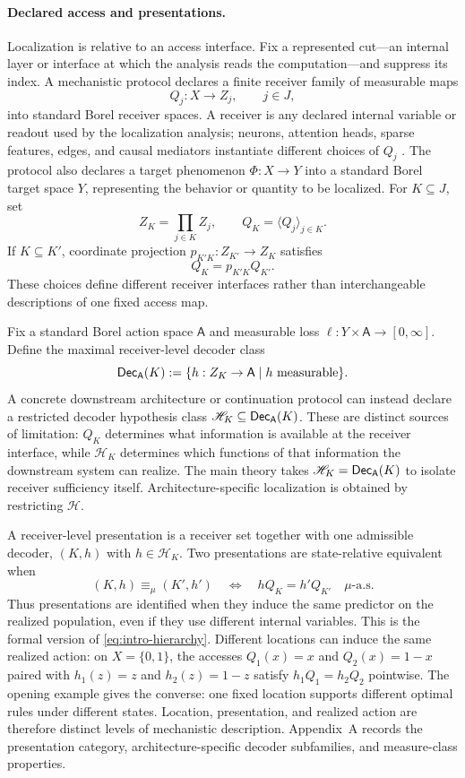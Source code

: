 \paragraph{Declared access and presentations.}
Localization is relative to an access interface. Fix a represented cut---an internal layer or interface at which the analysis reads the computation---and suppress its index. A mechanistic protocol declares a finite receiver family of measurable maps
\[
Q_j:X\to Z_j,\qquad j\in J,
\]
into standard Borel receiver spaces. A receiver is any declared internal variable or readout used by the localization analysis; neurons, attention heads, sparse features, edges, and causal mediators instantiate different choices of $Q_j$ \citep{mueller2025mib,mueller2026mediator}. The protocol also declares a target phenomenon $\Phi:X\to Y$ into a standard Borel target space $Y$, representing the behavior or quantity to be localized. For $K\subseteq J$, set
\[
Z_K=\prod_{j\in K}Z_j,\qquad Q_K=\langle Q_j\rangle_{j\in K}.
\]
If $K\subseteq K'$, coordinate projection $p_{K'K}:Z_{K'}\to Z_K$ satisfies
\begin{equation}
Q_K=p_{K'K}Q_{K'}.
\label{eq:receiver-garbling}
\end{equation}
These choices define different receiver interfaces rather than interchangeable descriptions of one fixed access map.

Fix a standard Borel action space $\mathsf A$ and measurable loss $\ell:Y\times\mathsf A\to[0,\infty]$. Define the maximal receiver-level decoder class
\[
\mathsf{Dec}_{\mathsf A}(K):=\{h:Z_K\to\mathsf A\mid h\text{ measurable}\}.
\]
A concrete downstream architecture or continuation protocol can instead declare a restricted decoder hypothesis class $\mathscr H_K\subseteq\mathsf{Dec}_{\mathsf A}(K)$. These are distinct sources of limitation: $Q_K$ determines what information is available at the receiver interface, while $\mathscr H_K$ determines which functions of that information the downstream system can realize. The main theory takes $\mathscr H_K=\mathsf{Dec}_{\mathsf A}(K)$ to isolate receiver sufficiency itself. Architecture-specific localization is obtained by restricting $\mathscr H$.

A receiver-level presentation is a receiver set together with one admissible decoder, $(K,h)$ with $h\in\mathscr H_K$. Two presentations are state-relative equivalent when
\[
(K,h)\equiv_\mu(K',h')
\quad\Longleftrightarrow\quad
hQ_K=h'Q_{K'}\quad\mu\text{-a.s.}
\]
Thus presentations are identified when they induce the same predictor on the realized population, even if they use different internal variables. This is the formal version of \cref{eq:intro-hierarchy}. Different locations can induce the same realized action: on $X=\{0,1\}$, the accesses $Q_1(x)=x$ and $Q_2(x)=1-x$ paired with $h_1(z)=z$ and $h_2(z)=1-z$ satisfy $h_1Q_1=h_2Q_2$ pointwise. The opening example gives the converse: one fixed location supports different optimal rules under different states. Location, presentation, and realized action are therefore distinct levels of mechanistic description. Appendix~A records the presentation category, architecture-specific decoder subfamilies, and measure-class properties.

